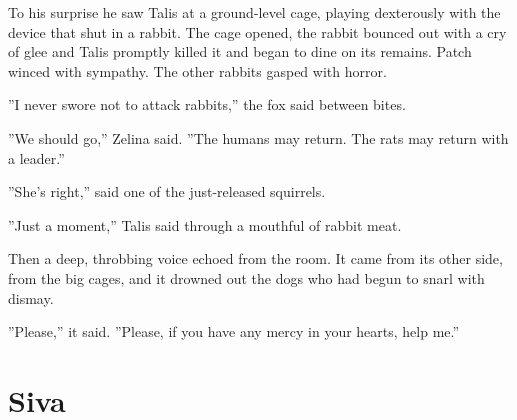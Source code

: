 \documentclass[12pt]{book}
\begin{document}
 To his surprise he saw Talis at a ground-level cage, playing dexterously with the device that shut in a rabbit. The cage opened, the rabbit bounced out with a cry of glee %
 and Talis promptly killed it and began to dine on its remains. Patch winced with sympathy. The other rabbits gasped with horror.\par
 ''I never swore not to attack rabbits,'' the fox said between bites.\par
 ''We should go,'' Zelina said. ''The humans may return. The rats may return with a leader.''\par
 ''She's right,'' said one of the just-released squirrels.\par
 ''Just a moment,'' Talis said through a mouthful of rabbit meat.\par
 Then a deep, throbbing voice echoed from the room. It came from its other side, from the big cages, and it drowned out the dogs who had begun to snarl with dismay.\par
 ''Please,'' it said. ''Please, if you have any mercy in your hearts, help me.''\par

\section{Siva}
\end{document}
